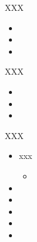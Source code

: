 \begin{frame}[fragile]{XXX}
\begin{itemize}
\item
\item
\item
\end{itemize}
\end{frame}

\begin{frame}[fragile]{XXX}
\begin{itemize}
\item
\item
\item
\end{itemize}
\end{frame}


\begin{frame}[fragile]{XXX}
\begin{itemize}
\item xxx
\begin{itemize}
\item
\end{itemize}
\item
\item
\item
\item
\item
\end{itemize}
\end{frame}


